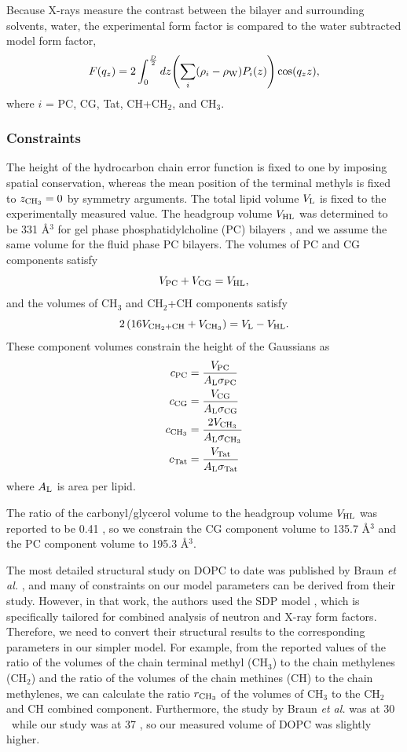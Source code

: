 Because X-rays measure the contrast between the bilayer and surrounding solvents, 
water, the experimental form factor is compared to the water subtracted model
form factor,
\begin{equation}
  F(q_z) = 2\int_0^{\frac{D}{2}} \mathop{dz} \mathopen{}\left( 
    \sum_i(\rho_i-\rho_\textrm{W})P_i(z)
   \right)\mathclose{} \cos(q_zz),
\end{equation}
where $i$ = PC, CG, Tat, CH+CH$_2$, and CH$_3$.

\subsubsection{Constraints}
The height of the hydrocarbon chain error function is fixed to one by imposing
spatial conservation, whereas the mean position of the terminal methyls is
fixed to $z_{\textrm{CH}_3}=0$ by symmetry arguments. The total lipid volume
$V_\textrm{L}$ is fixed to the experimentally measured value. 
The headgroup volume $V_\textrm{HL}$ was determined to be 331 \AA$^3$ for 
gel phase phosphatidylcholine (PC) bilayers \cite{Tristram-Nagle02},
and we assume the same volume for the fluid phase PC bilayers.
The volumes of PC and CG components satisfy
\begin{equation}
  V_\textrm{PC} + V_\textrm{CG} = V_\textrm{HL},
\end{equation}
and the volumes of CH$_3$ and CH$_2$+CH components satisfy
\begin{equation}
  2\left(16V_{\textrm{CH}_2+\textrm{CH}} + V_{\textrm{CH}_3}\right) = V_\textrm{L}-V_\textrm{HL}.
\end{equation}
These component volumes constrain the height of the Gaussians as
\begin{align}
  c_\textrm{PC} &= \frac{V_\textrm{PC}}{A_\textrm{L}\sigma_\textrm{PC}} \\
  c_\textrm{CG} &= \frac{V_\textrm{CG}}{A_\textrm{L}\sigma_\textrm{CG}} \\
  c_{\textrm{CH}_3} &= \frac{2V_{\textrm{CH}_3}}{A_\textrm{L}\sigma_{\textrm{CH}_3}} \\
  c_\textrm{Tat} &= \frac{V_\textrm{Tat}}{A_\textrm{L}\sigma_\textrm{Tat}}
\end{align}
where $A_\textrm{L}$ is area per lipid.

The ratio of 
the carbonyl/glycerol volume to the headgroup volume $V_\textrm{HL}$ was
reported to be 0.41 \cite{Braun13}, so we constrain the CG
component volume to 135.7 \AA$^3$ and the PC component volume to 
195.3 \AA$^3$. 

The most detailed structural study on DOPC to date was published 
by Braun \textit{et al.} \cite{Braun13}, 
and many of constraints on our model parameters can be derived
from their study. However, in that work, the authors used the 
SDP model \cite{Kucerka08}, which is specifically tailored for
combined analysis of neutron and X-ray form factors. 
Therefore, we need to convert their structural results to the 
corresponding parameters in our simpler model. For example, 
from the reported values of the ratio of the volumes of the chain terminal
methyl (CH$_3$) to the chain methylenes (CH$_2$) and the ratio of 
the volumes of the chain methines (CH) to the chain methylenes, we can
calculate the ratio $r_{\textrm{CH}_3}$ of the volumes of CH$_3$ to the CH$_2$ and
CH combined component.  
Furthermore, the study by Braun \textit{et al.} was at 30 \textcelsius\
while our study was at 37 \textcelsius, so our
measured volume of DOPC was slightly higher.

